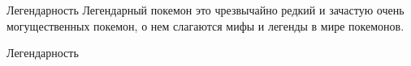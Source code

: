 \documentclass[10pt]{beamer}
\begin{document}
\begin{frame}{Легендарность}
\alert{Легендарный покемон} это чрезвычайно редкий и зачастую очень могущественных покемон, о нем слагаются мифы и легенды в мире покемонов.
\end{frame}

\begin{frame}{Легендарность}
	\begin{figure}
	    \centering
	    \qquad
    	    \qquad
    	    \qquad
    	    \qquad
	    \qquad 
	    \qquad
	    \qquad
	\end{figure}
\end{frame}
\end{document}
